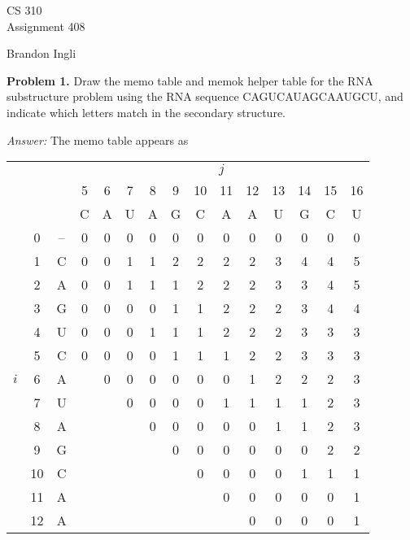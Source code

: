 \documentclass[11pt]{article}
\begin{document}
\thispagestyle{empty}

\begin{center}
{\large CS 310}\\
Assignment 408
\end{center}

\begin{flushright}
Brandon Ingli
\end{flushright}

\textbf{Problem 1.} Draw the memo table and memok helper table for the
RNA substructure problem using the RNA sequence CAGUCAUAGCAAUGCU, and
indicate which letters match in the secondary structure.

\textit{Answer:} The memo table appears as 

\begin{center}
\begin{tabular}{ccc|*{12}{c|}}
  \multicolumn{3}{c}{}  & \multicolumn{12}{c}{$j$}  \\
   &    &   & 5 & 6 & 7 & 8 & 9 & 10& 11& 12& 13& 14& 15& 16\\
   &    &   & C & A & U & A & G & C & A & A & U & G & C & U \\\cline{2-15}
   &  0 & --& 0 & 0 & 0 & 0 & 0 & 0 & 0 & 0 & 0 & 0 & 0 & 0 \\\cline{2-15}
   &  1 & C & 0 & 0 & 1 & 1 & 2 & 2 & 2 & 2 & 3 & 4 & 4 & 5 \\\cline{2-15}
   &  2 & A & 0 & 0 & 1 & 1 & 1 & 2 & 2 & 2 & 3 & 3 & 4 & 5 \\\cline{2-15}
   &  3 & G & 0 & 0 & 0 & 0 & 1 & 1 & 2 & 2 & 2 & 3 & 4 & 4 \\\cline{2-15}
   &  4 & U & 0 & 0 & 0 & 1 & 1 & 1 & 2 & 2 & 2 & 3 & 3 & 3 \\\cline{2-15}
   &  5 & C & 0 & 0 & 0 & 0 & 1 & 1 & 1 & 2 & 2 & 3 & 3 & 3 \\\cline{2-15}
$i$&  6 & A &   & 0 & 0 & 0 & 0 & 0 & 0 & 1 & 2 & 2 & 2 & 3 \\\cline{2-15}
   &  7 & U &   &   & 0 & 0 & 0 & 0 & 1 & 1 & 1 & 1 & 2 & 3 \\\cline{2-15}
   &  8 & A &   &   &   & 0 & 0 & 0 & 0 & 0 & 1 & 1 & 2 & 3 \\\cline{2-15}
   &  9 & G &   &   &   &   & 0 & 0 & 0 & 0 & 0 & 0 & 2 & 2 \\\cline{2-15}
   & 10 & C &   &   &   &   &   & 0 & 0 & 0 & 0 & 1 & 1 & 1 \\\cline{2-15}
   & 11 & A &   &   &   &   &   &   & 0 & 0 & 0 & 0 & 0 & 1 \\\cline{2-15}
   & 12 & A &   &   &   &   &   &   &   & 0 & 0 & 0 & 0 & 1 \\\cline{2-15}
\end{tabular}
\end{center}
\end{document}
